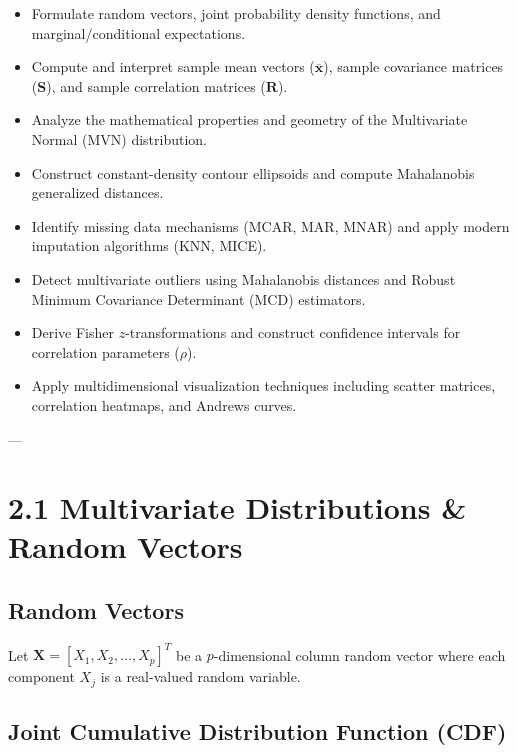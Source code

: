 \documentclass[
]{article}
\begin{document}
\begin{itemize}
\item
  Formulate random vectors, joint probability density functions, and
  marginal/conditional expectations.
\item
  Compute and interpret sample mean vectors (\(\overline{\mathbf{x}}\)),
  sample covariance matrices (\(\mathbf{S}\)), and sample correlation
  matrices (\(\mathbf{R}\)).
\item
  Analyze the mathematical properties and geometry of the Multivariate
  Normal (MVN) distribution.
\item
  Construct constant-density contour ellipsoids and compute Mahalanobis
  generalized distances.
\item
  Identify missing data mechanisms (MCAR, MAR, MNAR) and apply modern
  imputation algorithms (KNN, MICE).
\item
  Detect multivariate outliers using Mahalanobis distances and Robust
  Minimum Covariance Determinant (MCD) estimators.
\item
  Derive Fisher \(z\)-transformations and construct confidence intervals
  for correlation parameters (\(\rho\)).
\item
  Apply multidimensional visualization techniques including scatter
  matrices, correlation heatmaps, and Andrews curves.
\end{itemize}

---

\textbf{ }

\section{2.1 Multivariate Distributions \& Random Vectors}

\textbf{ }

\subsection{Random Vectors}

Let
\(\mathbf{X} = \left\lbrack X_{1},X_{2},\ldots,X_{p} \right\rbrack^{T}\)
be a \(p\)-dimensional column random vector where each component
\(X_{j}\) is a real-valued random variable.

\textbf{ }

\subsection{Joint Cumulative Distribution Function (CDF)}
\end{document}
